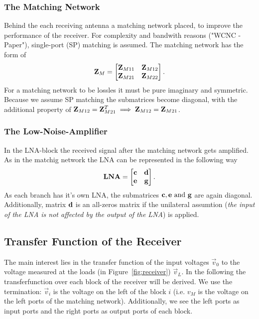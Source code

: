 \subsubsection{The Matching Network}
Behind the each receiving antenna a matching network placed, to improve the performance of the receiver.
For complexity and bandwith reasons ("WCNC - Paper"), single-port (SP) matching is assumed.
The matching network has the form of 
\begin{equation}
\mathbf{Z}_M=
\begin{bmatrix}
\mathbf{Z}_{M11} & \mathbf{Z}_{M12} \\
\mathbf{Z}_{M21} & \mathbf{Z}_{M22}
\end{bmatrix}.
\end{equation}
For a matching network to be lossles it must be pure imaginary and symmetric\cite{Nossek}.
Because we assume SP matching the submatrices become diagonal, with the additional property of $\mathbf{Z}_{M12} = \mathbf{Z}_{M21}^T \implies \mathbf{Z}_{M12} = \mathbf{Z}_{M21}$.


\subsubsection{The Low-Noise-Amplifier}
In the LNA-block the received signal after the matching network gets amplified.
As in the matchig network the LNA can be represented in the following way
\begin{equation}
\mathbf{LNA}=
\begin{bmatrix}
\mathbf{c} & \mathbf{d} \\
\mathbf{e} & \mathbf{g}
\end{bmatrix}.
\end{equation}
As each branch has it's own LNA, the submatrices $\mathbf{c},\mathbf{e}\text{ and }\mathbf{g}$ are again diagonal.
Additionally, matrix $\mathbf{d}$ is an all-zeros matrix if the unilateral assumtion (\textit{the input of the LNA is not affected by the output of the LNA}) is applied.

\subsection{Transfer Function of the Receiver}
\label{sec:transf}
The main interest lies in the transfer function of the input voltages $\vec{v}_0$ to the voltage measured at the loads (in Figure~\ref{fig:receiver}) $\vec{v}_L$.
In the following the transferfunction over each block of the receiver will be derived.
We use the termination: $\vec{v}_i$ is the voltage on the left of the block $i$ (i.e. $v_{M}$ is the voltage on the left ports of the matching network).
Additionally, we see the left ports as input ports and the right ports as output ports of each block.

